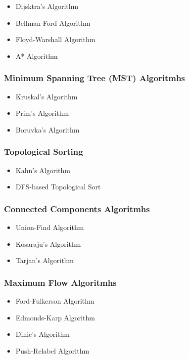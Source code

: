 \begin{itemize}
    \item Dijsktra's Algorithm
    \item Bellman-Ford Algorithm
    \item Floyd-Warshall Algorithm
    \item A* Algorithm
\end{itemize}

\subsubsection{Minimum Spanning Tree (MST) Algoritmhs}

\begin{itemize}
    \item Kruskal's Algorithm
    \item Prim's Algorithm
    \item Boruvka's Algorithm
\end{itemize}

\subsubsection{Topological Sorting}

\begin{itemize}
    \item Kahn's Algorithm
    \item DFS-based Topological Sort
\end{itemize}

\subsubsection{Connected Components Algoritmhs}

\begin{itemize}
    \item Union-Find Algorithm
    \item Kosaraju's Algorithm
    \item Tarjan's Algorithm
\end{itemize}

\subsubsection{Maximum Flow Algoritmhs}

\begin{itemize}
    \item Ford-Fulkerson Algorithm
    \item Edmonds-Karp Algorithm
    \item Dinic's Algorithm
    \item Push-Relabel Algorithm
\end{itemize}

